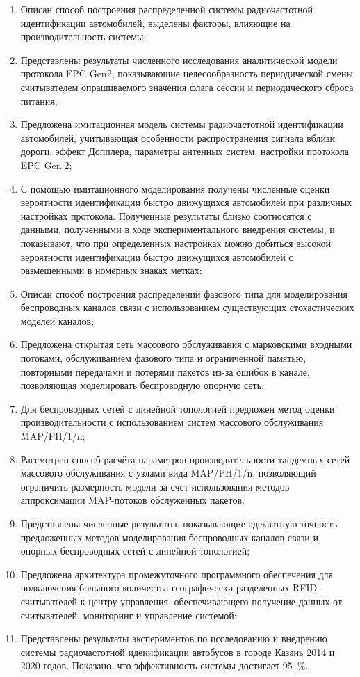 \begin{enumerate}
  \item Описан способ построения распределенной системы радиочастотной идентификации автомобилей, выделены факторы, влияющие на производительность системы;
  \item Представлены результаты численного исследования аналитической модели протокола EPC Gen2, показывающие целесообразность периодической смены считывателем опрашиваемого значения флага сессии и периодического сброса питания;
  \item Предложена имитационная модель системы радиочастотной идентификации автомобилей, учитывающая особенности распространения сигнала вблизи дороги, эффект Допплера, параметры антенных систем, настройки протокола EPC Gen.2;
  \item С помощью имитационного моделирования получены численные оценки вероятности идентификации быстро движущихся автомобилей при различных настройках протокола. Полученные результаты близко соотносятся с данными, полученными в ходе экспериментального внедрения системы, и показывают, что при определенных настройках можно добиться высокой вероятности идентификации быстро движущихся автомобилей с размещенными в номерных знаках метках;
  \item Описан способ построения распределений фазового типа для моделирования беспроводных каналов связи с использованием существующих стохастических моделей каналов;
  \item Предложена открытая сеть массового обслуживания с марковскими входными потоками, обслуживанием фазового типа и ограниченной памятью, повторными передачами и потерями пакетов из-за ошибок в канале, позволяющая моделировать беспроводную опорную сеть;
  \item Для беспроводных сетей с линейной топологией предложен метод оценки производительности с использованием систем массового обслуживания MAP/PH/1/n;
  \item Рассмотрен способ расчёта параметров производительности тандемных сетей массового обслуживания с узлами вида MAP/PH/1/n, позволяющий ограничить размерность модели за счет использования методов аппроксимации MAP-потоков обслуженных пакетов;
  \item Представлены численные результаты, показывающие адекватную точность предложенных методов моделирования беспроводных каналов связи и опорных беспроводных сетей с линейной топологией;
  \item Предложена архитектура промежуточного программного обеспечения для подключения большого количества географически разделенных RFID-считывателей к центру управления, обеспечивающего получение данных от считывателей, мониторинг и управление системой;
  \item Представлены результаты экспериментов по исследованию и внедрению системы радиочастотной иденификации автобусов в городе Казань 2014 и 2020 годов. Показано, что эффективность системы достигает 95~\%.
\end{enumerate}
